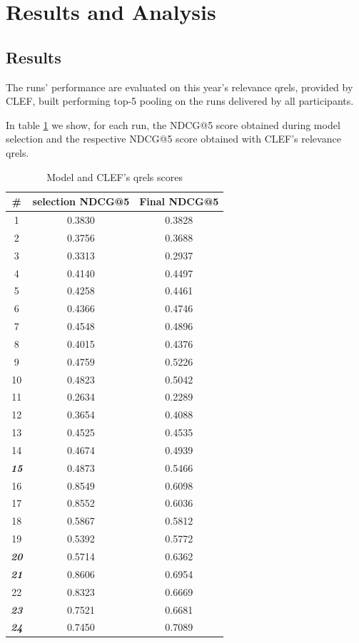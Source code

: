 \section{Results and Analysis}
\label{sec:results and analysis}

\subsection{Results}

The runs' performance are evaluated on this year's relevance qrels, provided by CLEF, built performing top-5 pooling on the runs delivered by all participants. \citep{bondarenko:2022e}

In table \ref{tab:compare-results} we show, for each run, the NDCG@5 score obtained during model selection and the respective NDCG@5 score obtained with CLEF's relevance qrels.

\begin{table}[t]
	\caption{Model and CLEF's qrels scores}
	\label{tab:compare-results}
	\centering
	\begin{tabular}{|c|c|c|}
	\toprule
	\# & selection NDCG@5 & Final NDCG@5 \\
	\midrule
	1 & 0.3830 & 0.3828 \\
	2 & 0.3756 & 0.3688 \\
	3 & 0.3313 & 0.2937 \\
	\hline
	4 & 0.4140 & 0.4497 \\
	5 & 0.4258 & 0.4461 \\
	6 & 0.4366 & 0.4746 \\
	7 & 0.4548 & 0.4896 \\
	\hline
	8 & 0.4015 & 0.4376 \\
	9 & 0.4759 & 0.5226 \\
	10 & 0.4823 & 0.5042 \\
	\hline
	11 & 0.2634 & 0.2289 \\
	12 & 0.3654 & 0.4088 \\
	13 & 0.4525 & 0.4535 \\
	14 & 0.4674 & 0.4939 \\
	\hline
	\textit{\textbf{15}} & 0.4873 & 0.5466 \\
	\hline
	16 & 0.8549 & 0.6098 \\
	17 & 0.8552 & 0.6036 \\
	\hline
	18 & 0.5867 & 0.5812 \\
	19 & 0.5392 & 0.5772 \\
	\textit{\textbf{20}} & 0.5714 & 0.6362 \\
	\textit{\textbf{21}} & 0.8606 & 0.6954 \\
	22 & 0.8323 & 0.6669 \\
	\hline
	\textit{\textbf{23}} & 0.7521 & 0.6681\\
	\textit{\textbf{24}} & 0.7450 & 0.7089\\
	\bottomrule
\end{tabular}
\end{table}

